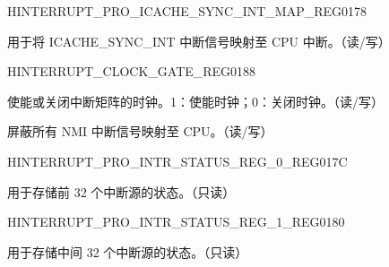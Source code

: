 \begin{register}{H}{INTERRUPT\_PRO\_ICACHE\_SYNC\_INT\_MAP\_REG}{\hexprefix{}0178}\label{regdesc:INTERRUPTPROICACHESYNCINTMAPREG}
%
%
\regnewline%
\begin{regdesc}\begin{reglist}
\label{fielddesc:INTERRUPTPROICACHESYNCINTMAP}\item [INTERRUPT\_PRO\_ICACHE\_SYNC\_INT\_MAP] 用于将 ICACHE\_SYNC\_INT 中断信号映射至 CPU 中断。（读/写）
\end{reglist}\end{regdesc}
\end{register}


\begin{register}{H}{INTERRUPT\_CLOCK\_GATE\_REG}{\hexprefix{}0188}\label{regdesc:INTERRUPTCLOCKGATEREG}
%
%
%
\regnewline%
\begin{regdesc}\begin{reglist}
\label{fielddesc:INTERRUPTCLKEN}\item [INTERRUPT\_CLK\_EN] 使能或关闭中断矩阵的时钟。1：使能时钟；0：关闭时钟。（读/写）
\label{fielddesc:INTERRUPTPRONMIMASKHW}\item [INTERRUPT\_PRO\_NMI\_MASK\_HW] 屏蔽所有 NMI 中断信号映射至 CPU。（读/写）
\end{reglist}\end{regdesc}
\end{register}


\begin{register}{H}{INTERRUPT\_PRO\_INTR\_STATUS\_REG\_0\_REG}{\hexprefix{}017C}\label{regdesc:INTERRUPTPROINTRSTATUSREG0REG}
%
\regnewline%
\begin{regdesc}\begin{reglist}
\label{fielddesc:INTERRUPTPROINTRSTATUS0}\item [INTERRUPT\_PRO\_INTR\_STATUS\_0] 用于存储前 32 个中断源的状态。（只读）
\end{reglist}\end{regdesc}
\end{register}


\begin{register}{H}{INTERRUPT\_PRO\_INTR\_STATUS\_REG\_1\_REG}{\hexprefix{}0180}\label{regdesc:INTERRUPTPROINTRSTATUSREG1REG}
%
\regnewline%
\begin{regdesc}\begin{reglist}
\label{fielddesc:INTERRUPTPROINTRSTATUS1}\item [INTERRUPT\_PRO\_INTR\_STATUS\_1] 用于存储中间 32 个中断源的状态。（只读）
\end{reglist}\end{regdesc}
\end{register}


